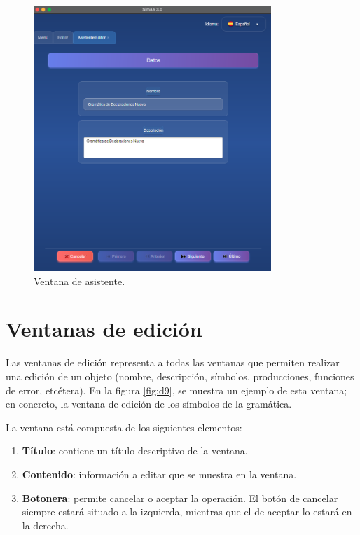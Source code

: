 \begin{figure}[htp]
\centering
	\includegraphics[width=0.8\textwidth]{figuras2/ejemplo_practico/editor_paso1.png}
	\caption{Ventana de asistente.}
	\label{fig:d8}
\end{figure}

\section{Ventanas de edición} \label{sec:ventanas_edicion}

Las ventanas de edición representa a todas las ventanas que permiten realizar una edición de un objeto (nombre, descripción, símbolos, producciones, funciones de error, etcétera). En la figura \ref{fig:d9}, se muestra un ejemplo de esta ventana; en concreto, la ventana de edición de los símbolos de la gramática.

La ventana está compuesta de los siguientes elementos:
\begin{enumerate}
 \item \textbf{Título}: contiene un título descriptivo de la ventana.
 \item \textbf{Contenido}: información a editar que se muestra en la ventana.
 \item \textbf{Botonera}: permite cancelar o aceptar la operación. El botón de cancelar siempre estará situado a la izquierda, mientras que el de aceptar lo estará en la derecha.
\end{enumerate}


